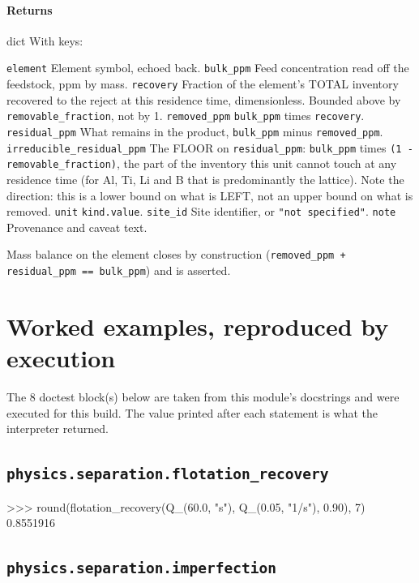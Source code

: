 \documentclass[10pt,a4paper,twoside]{report}
\begin{document}
\paragraph*{Returns}

dict With keys:

\texttt{element} Element symbol, echoed back. \texttt{bulk\_ppm} Feed concentration read off the feedstock, ppm by mass. \texttt{recovery} Fraction of the element's TOTAL inventory recovered to the reject at this residence time, dimensionless. Bounded above by \texttt{removable\_fraction}, not by 1. \texttt{removed\_ppm} \texttt{bulk\_ppm} times \texttt{recovery}. \texttt{residual\_ppm} What remains in the product, \texttt{bulk\_ppm} minus \texttt{removed\_ppm}. \texttt{irreducible\_residual\_ppm} The FLOOR on \texttt{residual\_ppm}: \texttt{bulk\_ppm} times \texttt{(1 - removable\_fraction)}, the part of the inventory this unit cannot touch at any residence time (for Al, Ti, Li and B that is predominantly the lattice). Note the direction: this is a lower bound on what is LEFT, not an upper bound on what is removed. \texttt{unit} \texttt{kind.value}. \texttt{site\_id} Site identifier, or \texttt{"not specified"}. \texttt{note} Provenance and caveat text.

Mass balance on the element closes by construction (\texttt{removed\_ppm + residual\_ppm == bulk\_ppm}) and is asserted.

\section{Worked examples, reproduced by execution}

The 8 doctest block(s) below are taken from this module's docstrings and were executed for this build. The value printed after each statement is what the interpreter returned.

\subsection*{\texttt{physics.separation.flotation\_recovery}}

\begin{doctestblock}
>>> round(flotation_recovery(Q_(60.0, "s"), Q_(0.05, "1/s"), 0.90), 7)
0.8551916
\end{doctestblock}

\subsection*{\texttt{physics.separation.imperfection}}
\end{document}
